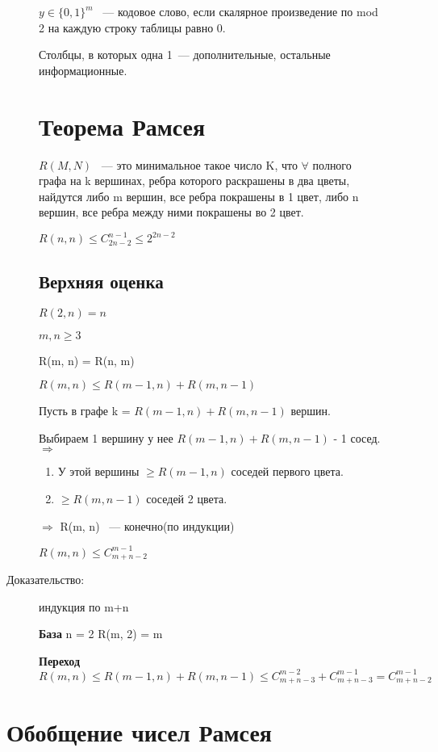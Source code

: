 \documentclass[12pt]{article}
\begin{document}
\begin{description}
\begin{description}
$y \in \{0, 1\}^m$ ~--- кодовое слово, если скалярное произведение по mod 2 на каждую строку таблицы равно 0.

Столбцы, в которых одна 1~--- дополнительные, остальные информационные. 

\section{Теорема Рамсея}

$R(M, N)$ ~--- это минимальное такое число K, что $\forall$ полного графа на k вершинах, ребра которого раскрашены в два цветы, найдутся либо m вершин, все ребра покрашены в 1 цвет, либо n вершин, все ребра между ними покрашены во 2 цвет. 

$R(n, n) \le C_{2n - 2}^{n - 1} \le 2^{2n - 2}$
 
\subsection{Верхняя оценка}
$R(2, n) = n$

$m, n \ge 3$

R(m, n) = R(n, m)

$R(m, n) \le R(m - 1, n) + R(m, n - 1)$

Пусть в графе k = $R(m - 1, n) + R(m, n - 1)$ вершин.

Выбираем 1 вершину у нее $R(m - 1, n) + R(m, n - 1)$ - 1 сосед. $\Rightarrow$ 
\begin{enumerate}
\item У этой вершины $\ge R(m - 1, n)$ соседей первого цвета.
\item $\ge R(m, n - 1)$ соседей 2 цвета. 
\end{enumerate}

$\Rightarrow$ R(m, n) ~--- конечно(по индукции)

$R(m, n) \le C_{m + n - 2}^{m - 1}$

\item[Доказательство:] индукция по m+n 

{\bf База} n = 2 R(m, 2) = m

{\bf Переход} $R(m, n) \le R(m - 1, n) + R(m, n - 1) \le C_{m + n - 3}^{m - 2} + C_{m + n - 3}^{m - 1} = C_{m + n - 2}^{m - 1}$
\end{description}

\section{Обобщение чисел Рамсея}


\end{description}
\end{document}
